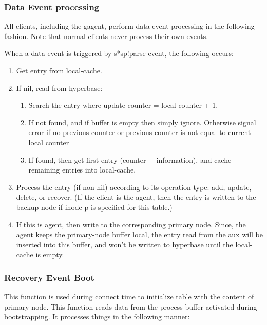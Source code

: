 \subsubsection{Data Event processing}

All clients, including the gagent, perform data event processing in the
following fashion.  Note that normal clients never process their own 
events. 

When a data event is triggered by s*sp!parse-event, the following occurs:

\begin{enumerate}
\item Get entry from local-cache.
\item If nil, read from hyperbase:
  \begin{enumerate}
   \item Search the entry where update-counter = local-counter + 1.
     
    \item If not found, and if buffer is empty then simply ignore.
     Otherwise signal error if no previous counter or previous-counter
     is not equal to current local counter
     
    \item If found, then get first entry (counter + information), and cache
     remaining entries into local-cache.
   \end{enumerate}
     
 \item Process the entry (if non-nil) according to its operation type:
   add, update, delete, or recover.  (If the client is the agent, then the
   entry is written to the backup node if inode-p is specified for this
   table.)
     
 \item If this is agent, then write to the corresponding primary node.
   Since, the agent keeps the primary-node buffer local, the entry read from
   the aux will be inserted into this buffer, and won't be written to
   hyperbase until the local-cache is empty.

\end{enumerate}

\subsubsection{Recovery Event Boot}

This function is used during connect time to initialize table with the
content of primary node.  This function reads data from the process-buffer
activated during bootstrapping.  It processes things in the following
manner:

